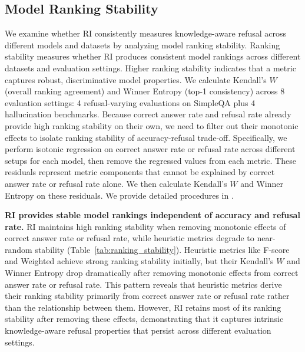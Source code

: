 \documentclass{article} %
\theoremstyle{definition}
\begin{document}
\vspace{-0.5em}
\subsection{Model Ranking Stability}
\vspace{-0.5em}

We examine whether RI consistently measures knowledge-aware refusal across different models and datasets by analyzing model ranking stability. 
Ranking stability measures whether RI produces consistent model rankings across different datasets and evaluation settings. 
Higher ranking stability indicates that a metric captures robust, discriminative model properties. 
We calculate Kendall's $W$ (overall ranking agreement) and Winner Entropy (top-1 consistency) across 8 evaluation settings: 4 refusal-varying evaluations on SimpleQA plus 4 hallucination benchmarks. 
Because correct answer rate and refusal rate already provide high ranking stability on their own, we need to filter out their monotonic effects to isolate ranking stability of accuracy-refusal trade-off.
Specifically, we perform isotonic regression on correct answer rate or refusal rate across different setups for each model, then remove the regressed values from each metric. 
These residuals represent metric components that cannot be explained by correct answer rate or refusal rate alone. We then calculate Kendall's $W$ and Winner Entropy on these residuals.
We provide detailed procedures in .

\noindent\textbf{RI provides stable model rankings independent of \textcolor{green!60!black}{accuracy and refusal rate}.} 
RI maintains high ranking stability when removing monotonic effects of correct answer rate or refusal rate, while heuristic metrics degrade to near-random stability (Table~\ref{tab:ranking_stability}). 
Heuristic metrics like F-score and Weighted achieve strong ranking stability initially, but their Kendall's $W$ and Winner Entropy drop dramatically after removing monotonic effects from correct answer rate or refusal rate. 
This pattern reveals that heuristic metrics derive their ranking stability primarily from correct answer rate or refusal rate rather than the relationship between them. 
However, RI retains most of its ranking stability after removing these effects, demonstrating that it captures intrinsic knowledge-aware refusal properties that persist across different evaluation settings.
\end{document}
